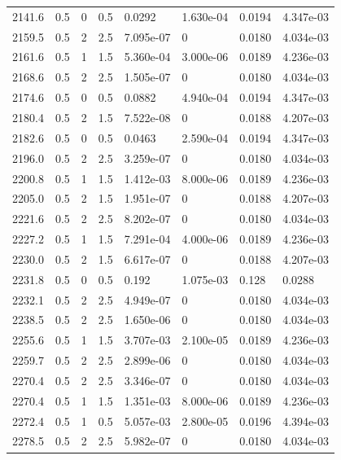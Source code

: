 \documentclass[preview]{standalone}
\begin{document}
{{{{{{{\begin{tabular}{L{1.2cm}C{1.2cm} C{0.3cm}C{0.5cm} C{1.4cm}C{1.4cm} C{1.4cm}C{1.4cm}}
  2141.6  &   0.5  & 0     & 0.5 &  0.0292  & 1.630e-04  & 0.0194 &  4.347e-03   \\ 
  2159.5  &   0.5  & 2     & 2.5 &  7.095e-07  & 0  & 0.0180 &  4.034e-03   \\ 
  2161.6  &   0.5  & 1     & 1.5 &  5.360e-04  & 3.000e-06  & 0.0189 &  4.236e-03   \\ 
  2168.6  &   0.5  & 2     & 2.5 &  1.505e-07  & 0  & 0.0180 &  4.034e-03   \\ 
  2174.6  &   0.5  & 0     & 0.5 &  0.0882  & 4.940e-04  & 0.0194 &  4.347e-03   \\ 
  2180.4  &   0.5  & 2     & 1.5 &  7.522e-08  & 0  & 0.0188 &  4.207e-03   \\ 
  2182.6  &   0.5  & 0     & 0.5 &  0.0463  & 2.590e-04  & 0.0194 &  4.347e-03   \\ 
  2196.0  &   0.5  & 2     & 2.5 &  3.259e-07  & 0  & 0.0180 &  4.034e-03   \\ 
  2200.8  &   0.5  & 1     & 1.5 &  1.412e-03  & 8.000e-06  & 0.0189 &  4.236e-03   \\ 
  2205.0  &   0.5  & 2     & 1.5 &  1.951e-07  & 0  & 0.0188 &  4.207e-03   \\ 
  2221.6  &   0.5  & 2     & 2.5 &  8.202e-07  & 0  & 0.0180 &  4.034e-03   \\ 
  2227.2  &   0.5  & 1     & 1.5 &  7.291e-04  & 4.000e-06  & 0.0189 &  4.236e-03   \\ 
  2230.0  &   0.5  & 2     & 1.5 &  6.617e-07  & 0  & 0.0188 &  4.207e-03   \\ 
  2231.8  &   0.5  & 0     & 0.5 &  0.192  & 1.075e-03  & 0.128 &  0.0288   \\ 
  2232.1  &   0.5  & 2     & 2.5 &  4.949e-07  & 0  & 0.0180 &  4.034e-03   \\ 
  2238.5  &   0.5  & 2     & 2.5 &  1.650e-06  & 0  & 0.0180 &  4.034e-03   \\ 
  2255.6  &   0.5  & 1     & 1.5 &  3.707e-03  & 2.100e-05  & 0.0189 &  4.236e-03   \\ 
  2259.7  &   0.5  & 2     & 2.5 &  2.899e-06  & 0  & 0.0180 &  4.034e-03   \\ 
  2270.4  &   0.5  & 2     & 2.5 &  3.346e-07  & 0  & 0.0180 &  4.034e-03   \\ 
  2270.4  &   0.5  & 1     & 1.5 &  1.351e-03  & 8.000e-06  & 0.0189 &  4.236e-03   \\ 
  2272.4  &   0.5  & 1     & 0.5 &  5.057e-03  & 2.800e-05  & 0.0196 &  4.394e-03   \\ 
  2278.5  &   0.5  & 2     & 2.5 &  5.982e-07  & 0  & 0.0180 &  4.034e-03   \\ 

\end{tabular}}}}}}}}
\end{document}
